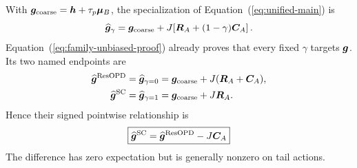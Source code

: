 With $\bm{g}_{\mathrm{coarse}}=\bm{h}+\tau_p\bm{\mu}_B$, the specialization of
Equation~(\ref{eq:unified-main}) is
\begin{equation}
 \widehat{\bm{g}}_\gamma
 =\bm{g}_{\mathrm{coarse}}
 +J\!\left[\bm{R}_A+(1-\gamma)\bm{C}_A\right].
 \label{eq:event-scta-family}
\end{equation}
Equation~(\ref{eq:family-unbiased-proof}) already proves that every fixed
$\gamma$ targets $\bm{g}$. Its two named endpoints are
\begin{equation}
 \begin{aligned}
 \widehat{\bm{g}}^{\mathrm{ResOPD}}
 &=\widehat{\bm{g}}_{\gamma=0}
  =\bm{g}_{\mathrm{coarse}}+J(\bm{R}_A+\bm{C}_A),\\
 \widehat{\bm{g}}^{\mathrm{SC}}
 &=\widehat{\bm{g}}_{\gamma=1}
  =\bm{g}_{\mathrm{coarse}}+J\bm{R}_A.
 \end{aligned}
\end{equation}
Hence their signed pointwise relationship is
\begin{equation}
 \boxed{
 \widehat{\bm{g}}^{\mathrm{SC}}
 =\widehat{\bm{g}}^{\mathrm{ResOPD}}-J\bm{C}_A
 }
 \label{eq:event-scta-difference}
\end{equation}
The difference has zero expectation but is generally nonzero on tail actions.

